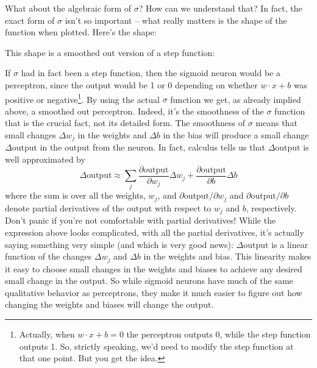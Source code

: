 \documentclass[a4paper,twoside,10pt]{book}
\begin{document}
What about the algebraic form of $\sigma$? How can we understand that? In fact, the exact form of $\sigma$ isn't so important -- what really matters is the shape of the function when plotted. Here's the shape:
\begin{center}
\end{center}
This shape is a smoothed out version of a step function:
\begin{center} 
\end{center}
If $\sigma$ had in fact been a step function, then the sigmoid neuron would be a perceptron, since the output would be 1 or 0 depending on whether $w\cdot x + b$ was positive or negative\footnote{Actually, when $w\cdot x+b = 0$ the perceptron outputs 0, while the step function outputs 1. So, strictly speaking, we'd need to modify the step function at that one point. But you get the idea.}. By using the actual $\sigma$ function we get, as already implied above, a smoothed out perceptron. Indeed, it's the smoothness of the $\sigma$ function that is the crucial fact, not its detailed form. The smoothness of $\sigma$ means that small changes $\Delta{}w_j$ in the weights and $\Delta{}b$ in the bias will produce a small change $\Delta\textrm{output}$ in the output from the neuron. In fact, calculus tells us that $\Delta\textrm{output}$ is well approximated by
\begin{equation}
\Delta\textrm{output}\approx \sum_j\frac{\partial\textrm{output}}{\partial w_j}\Delta w_j + \frac{\partial\textrm{output}}{\partial b}\Delta b
\label{eq:doutput}
\end{equation}		
where the sum is over all the weights, $w_j$, and $\partial\textrm{output}/\partial w_j$ and $\partial\textrm{output}/\partial b$ denote partial derivatives of the output with respect to $w_j$ and $b$, respectively. Don't panic if you're not comfortable with partial derivatives! While the expression above looks complicated, with all the partial derivatives, it's actually saying something very simple (and which is very good news): $\Delta\textrm{output}$ is a linear function of the changes $\Delta w_j$ and $\Delta b$ in the weights and bias. This linearity makes it easy to choose small changes in the weights and biases to achieve any desired small change in the output. So while sigmoid neurons have much of the same qualitative behavior as perceptrons, they make it much easier to figure out how changing the weights and biases will change the output.
\end{document}
